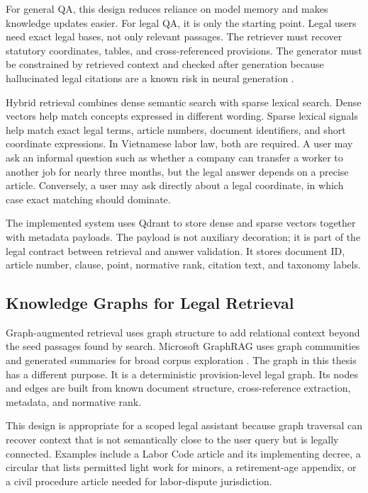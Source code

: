 For general QA, this design reduces reliance on model memory and makes knowledge updates easier. For legal QA, it is only the starting point. Legal users need exact legal bases, not only relevant passages. The retriever must recover statutory coordinates, tables, and cross-referenced provisions. The generator must be constrained by retrieved context and checked after generation because hallucinated legal citations are a known risk in neural generation \cite{ji2023survey}.

Hybrid retrieval combines dense semantic search with sparse lexical search. Dense vectors help match concepts expressed in different wording. Sparse lexical signals help match exact legal terms, article numbers, document identifiers, and short coordinate expressions. In Vietnamese labor law, both are required. A user may ask an informal question such as whether a company can transfer a worker to another job for nearly three months, but the legal answer depends on a precise article. Conversely, a user may ask directly about a legal coordinate, in which case exact matching should dominate.

The implemented system uses Qdrant to store dense and sparse vectors together with metadata payloads. The payload is not auxiliary decoration; it is part of the legal contract between retrieval and answer validation. It stores document ID, article number, clause, point, normative rank, citation text, and taxonomy labels.

\subsection{Knowledge Graphs for Legal Retrieval}
Graph-augmented retrieval uses graph structure to add relational context beyond the seed passages found by search. Microsoft GraphRAG uses graph communities and generated summaries for broad corpus exploration \cite{edge2024graphrag}. The graph in this thesis has a different purpose. It is a deterministic provision-level legal graph. Its nodes and edges are built from known document structure, cross-reference extraction, metadata, and normative rank.

This design is appropriate for a scoped legal assistant because graph traversal can recover context that is not semantically close to the user query but is legally connected. Examples include a Labor Code article and its implementing decree, a circular that lists permitted light work for minors, a retirement-age appendix, or a civil procedure article needed for labor-dispute jurisdiction.

